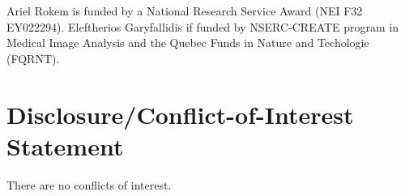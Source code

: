 \documentclass{bioinfo}
\begin{document}
Ariel Rokem is funded by a National Research Service Award (NEI F32 EY022294).
Eleftherios Garyfallidis if funded by NSERC-CREATE program in Medical
Image Analysis and the Quebec Funds in Nature and Techologie (FQRNT).

\section*{Disclosure/Conflict-of-Interest Statement}
There are no conflicts of interest.



%

%
%
%
%

\end{document}

